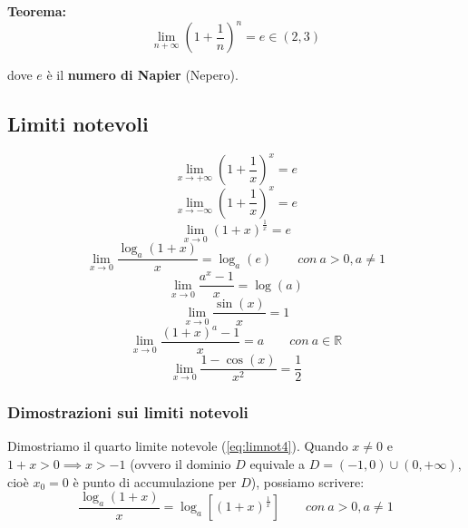 \documentclass{article}
\begin{document}
\noindent\textbf{Teorema:}
\begin{equation*}
    \lim_{n +\infty} \left(1 + \frac{1}{n}\right)^n = e \in (2, 3)
\end{equation*}

\noindent dove $e$ è il \textbf{numero di Napier} (Nepero).

\subsection{Limiti notevoli}
\begin{equation}
    \lim_{x \to +\infty} \left(1 + \frac{1}{x}\right)^x = e
    \label{eq:limnot1}
\end{equation}
\begin{equation}
    \lim_{x \to -\infty} \left(1 + \frac{1}{x}\right)^x = e
    \label{eq:limnot2}
\end{equation}
\begin{equation}
    \lim_{x \to 0} (1 + x)^\frac{1}{x} = e
    \label{eq:limnot3}
\end{equation}
\begin{equation}
    \lim_{x \to 0} \frac{\log_a(1 +x)}{x} = \log_a(e) \qquad con \ a > 0, a \neq 1
    \label{eq:limnot4}
\end{equation}
\begin{equation}
    \lim_{x \to 0} \frac{a^x - 1}{x} = \log(a)
    \label{eq:limnot5}
\end{equation}
\begin{equation}
    \lim_{x \to 0} \frac{\sin(x)}{x} = 1
    \label{eq:limnot6}
\end{equation}
\begin{equation}
    \lim_{x \to 0} \frac{(1 + x)^a - 1}{x} = a \qquad con \ a \in \mathbb{R}
    \label{eq:limnot7}
\end{equation}
\begin{equation}
    \lim_{x \to 0} \frac{1 - \cos(x)}{x^2} = \frac{1}{2}
    \label{eq:limnot8}
\end{equation}

\subsubsection{Dimostrazioni sui limiti notevoli}
\noindent Dimostriamo il quarto limite notevole (\ref{eq:limnot4}). Quando $x \neq 0$ e $1 + x > 0 \implies x > -1$ (ovvero il dominio $D$ equivale a $D = (-1, 0) \cup (0, +\infty)$, cioè $x_0 = 0$ è punto di accumulazione per $D$), possiamo scrivere:
\begin{equation*}
    \frac{\log_a(1 +x)}{x} = \log_a[(1 + x)^\frac{1}{x}] \qquad con \ a > 0, a \neq 1
\end{equation*}
\end{document}
